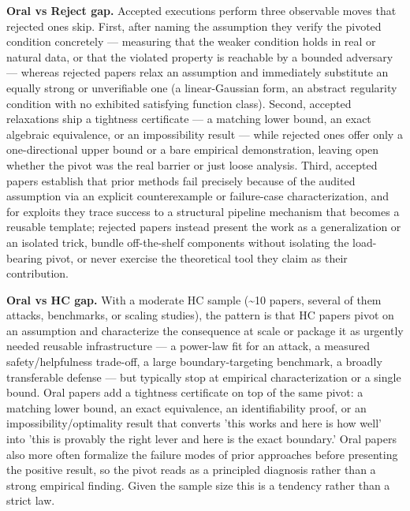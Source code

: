 \begin{tcolorbox}
\begin{itemize}[leftmargin=12pt,topsep=2pt,itemsep=2pt]
\end{itemize}
\textbf{Oral vs Reject gap.} Accepted executions perform three observable moves that rejected ones skip. First, after naming the assumption they verify the pivoted condition concretely --- measuring that the weaker condition holds in real or natural data, or that the violated property is reachable by a bounded adversary --- whereas rejected papers relax an assumption and immediately substitute an equally strong or unverifiable one (a linear-Gaussian form, an abstract regularity condition with no exhibited satisfying function class). Second, accepted relaxations ship a tightness certificate --- a matching lower bound, an exact algebraic equivalence, or an impossibility result --- while rejected ones offer only a one-directional upper bound or a bare empirical demonstration, leaving open whether the pivot was the real barrier or just loose analysis. Third, accepted papers establish that prior methods fail precisely because of the audited assumption via an explicit counterexample or failure-case characterization, and for exploits they trace success to a structural pipeline mechanism that becomes a reusable template; rejected papers instead present the work as a generalization or an isolated trick, bundle off-the-shelf components without isolating the load-bearing pivot, or never exercise the theoretical tool they claim as their contribution.

\textbf{Oral vs HC gap.} With a moderate HC sample (\textasciitilde{}10 papers, several of them attacks, benchmarks, or scaling studies), the pattern is that HC papers pivot on an assumption and characterize the consequence at scale or package it as urgently needed reusable infrastructure --- a power-law fit for an attack, a measured safety/helpfulness trade-off, a large boundary-targeting benchmark, a broadly transferable defense --- but typically stop at empirical characterization or a single bound. Oral papers add a tightness certificate on top of the same pivot: a matching lower bound, an exact equivalence, an identifiability proof, or an impossibility/optimality result that converts 'this works and here is how well' into 'this is provably the right lever and here is the exact boundary.' Oral papers also more often formalize the failure modes of prior approaches before presenting the positive result, so the pivot reads as a principled diagnosis rather than a strong empirical finding. Given the sample size this is a tendency rather than a strict law.


\end{tcolorbox}
